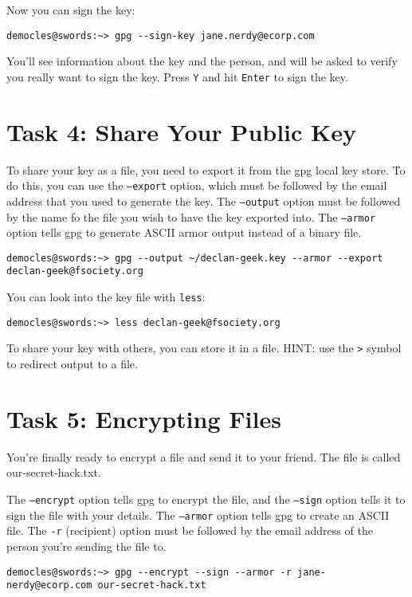 \documentclass{article}
\begin{document}
Now you can sign the key:
\begin{verbatim}
democles@swords:~> gpg --sign-key jane.nerdy@ecorp.com
\end{verbatim}

You’ll see information about the key and the person, and will be asked to verify you really want to sign the key. Press \texttt{Y} and hit \texttt{Enter} to sign the key.

\section{Task 4: Share Your Public Key}
To share your key as a file, you need to export it from the gpg local key store. To do this, you can use the \texttt{--export} option, which must be followed by the email address that you used to generate the key. The \texttt{--output} option must be followed by the name fo the file you wish to have the key exported into. The \texttt{--armor} option tells gpg to generate ASCII armor output instead of a binary file.

\begin{verbatim}
democles@swords:~> gpg --output ~/declan-geek.key --armor --export declan-geek@fsociety.org
\end{verbatim}

You can look into the key file with \texttt{less}:

\begin{verbatim}
democles@swords:~> less declan-geek@fsociety.org
\end{verbatim}

To share your key with others, you can store it in a file. HINT: use the \texttt{>} symbol to redirect output to a file.

\section{Task 5: Encrypting Files}
You're finally ready to encrypt a file and send it to your friend. The file is called our-secret-hack.txt.

The \texttt{--encrypt} option tells gpg to encrypt the file, and the \texttt{--sign} option tells it to sign the file with your details. The \texttt{--armor} option tells gpg to create an ASCII file. The \texttt{-r} (recipient) option must be followed by the email address of the person you're sending the file to.

\begin{verbatim}
democles@swords:~> gpg --encrypt --sign --armor -r jane-nerdy@ecorp.com our-secret-hack.txt
\end{verbatim}
\end{document}
